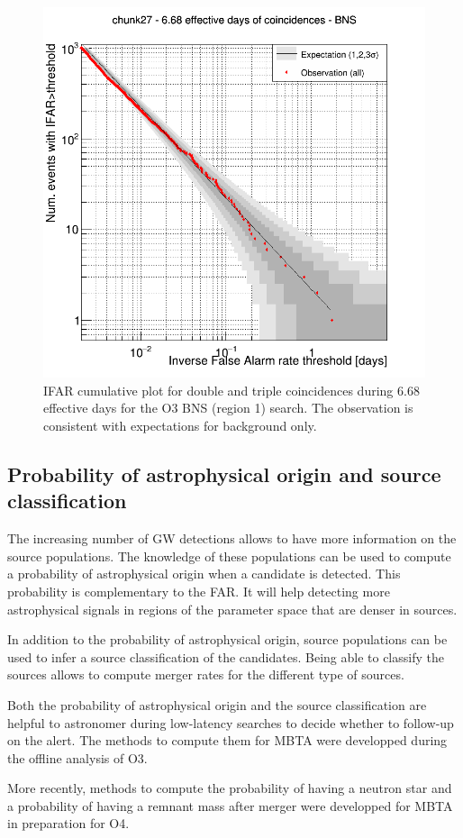 \begin{figure}[ht]
  \centering
  \includegraphics[width=0.5\linewidth]{sectionMBTA/IFAR_cum_chunk27.png}
  \caption{IFAR cumulative plot for double and triple coincidences during 6.68 effective days for the O3 BNS (region 1) search. The observation is consistent with expectations for background only.}
  \label{fig:ifar_cum}
\end{figure}







\subsection{Probability of astrophysical origin and source classification}
\label{sec:pastro}

The increasing number of GW detections allows to have more information on the source populations.
The knowledge of these populations can be used to compute a probability of astrophysical origin when a candidate is detected.
This probability is complementary to the FAR.
It will help detecting more astrophysical signals in regions of the parameter space that are denser in sources.

In addition to the probability of astrophysical origin, source populations can be used to infer a source classification of the candidates.
Being able to classify the sources allows to compute merger rates for the different type of sources.

Both the probability of astrophysical origin and the source classification are helpful to astronomer during low-latency searches to decide whether to follow-up on the alert.
The methods to compute them for MBTA were developped during the offline analysis of O3.

More recently, methods to compute the probability of having a neutron star and a probability of having a remnant mass after merger were developped for MBTA in preparation for O4.

